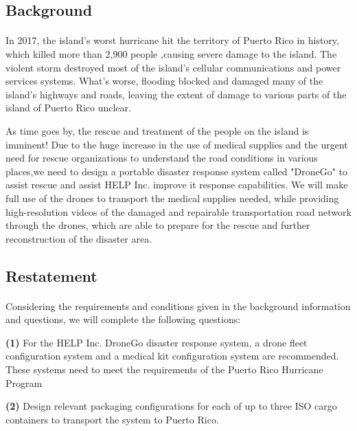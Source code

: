\documentclass{article} %
\begin{document}
     \subsection{Background}                      %
         \paragraph{}In 2017, the island's worst hurricane hit the territory of Puerto Rico in history, which killed more than 2,900 people ,causing severe damage to the island. The violent storm destroyed most of the island's cellular communications and power services systems. What’s worse, flooding blocked and damaged many of the island's highways and roads, leaving the extent of damage to various parts of the island of Puerto Rico unclear.


As time goes by, the rescue and treatment of the people on the island is imminent! Due to the huge increase in the use of medical supplies and the urgent need for rescue organizations to understand the road conditions in various places,we need to design a portable disaster response system called "DroneGo" to assist rescue and assist HELP Inc. improve it response capabilities.
We will make full use of the drones to transport the medical supplies needed, while providing high-resolution videos of the damaged and repairable transportation road network through the drones, which are able to prepare for the rescue and further reconstruction of the disaster area.

       \subsection{Restatement}
         \paragraph{}Considering the requirements and conditions given in the background information and questions, we will complete the following questions:


\textbf{(1)} For the HELP Inc. DroneGo disaster response system, a drone fleet configuration system and a medical kit configuration system are recommended. These systems need to meet the requirements of the Puerto Rico Hurricane Program

\textbf{(2)} Design relevant packaging configurations for each of up to three ISO cargo containers to transport the system to Puerto Rico.
\end{document}
